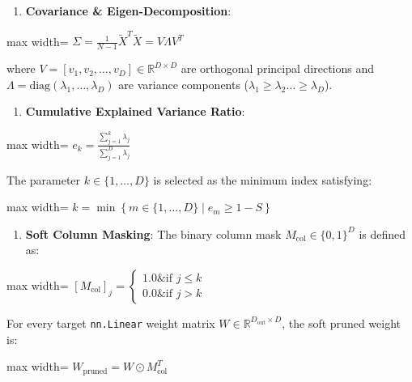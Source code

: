 \begin{enumerate}
\item \textbf{Covariance \& Eigen-Decomposition}:
\end{enumerate}
\begin{center}
\begin{adjustbox}{max width=\columnwidth}
$\displaystyle
\Sigma = \frac{1}{N-1} \widetilde{X}^T \widetilde{X} = V \Lambda V^T
$
\end{adjustbox}
\end{center}
where $V = [v_1, v_2, \dots, v_D] \in \mathbb{R}^{D \times D}$ are orthogonal principal directions and $\Lambda = \text{diag}(\lambda_1, \dots, \lambda_D)$ are variance components ($\lambda_1 \ge \lambda_2 \dots \ge \lambda_D$).

\begin{enumerate}
\item \textbf{Cumulative Explained Variance Ratio}:
\end{enumerate}
\begin{center}
\begin{adjustbox}{max width=\columnwidth}
$\displaystyle
e_k = \frac{\sum_{j=1}^k \lambda_j}{\sum_{j=1}^D \lambda_j}
$
\end{adjustbox}
\end{center}
The parameter $k \in \{1, \dots, D\}$ is selected as the minimum index satisfying:
\begin{center}
\begin{adjustbox}{max width=\columnwidth}
$\displaystyle
k = \min \left\{ m \in \{1, \dots, D\} \;\Big|\; e_m \ge 1 - S \right\}
$
\end{adjustbox}
\end{center}

\begin{enumerate}
\item \textbf{Soft Column Masking}:
The binary column mask $M_{\text{col}} \in \{0, 1\}^D$ is defined as:
\end{enumerate}
\begin{center}
\begin{adjustbox}{max width=\columnwidth}
$\displaystyle
[M_{\text{col}}]_j = \begin{cases} 1.0 \& \text{if } j \le k \\ 0.0 \& \text{if } j > k \end{cases}
$
\end{adjustbox}
\end{center}
For every target \texttt{nn.Linear} weight matrix $W \in \mathbb{R}^{D_{\text{out}} \times D}$, the soft pruned weight is:
\begin{center}
\begin{adjustbox}{max width=\columnwidth}
$\displaystyle
W_{\text{pruned}} = W \odot M_{\text{col}}^T
$
\end{adjustbox}
\end{center}


